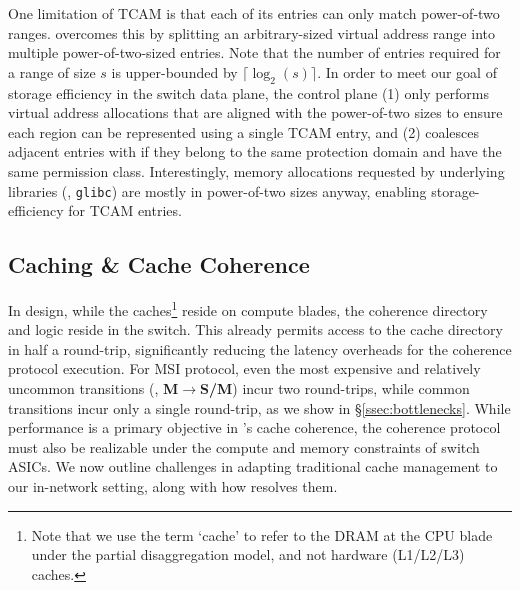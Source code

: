 One limitation of TCAM is that each of its entries can only match power-of-two ranges. \mind overcomes this by splitting an arbitrary-sized virtual address range into multiple power-of-two-sized entries. Note that the number of entries required for a range of size $s$ is upper-bounded by $\lceil\log_2(s)\rceil$. In order to meet our goal of storage efficiency in the switch data plane, the control plane (1) only performs virtual address allocations that are aligned with the power-of-two sizes to ensure each region can be represented using a single TCAM entry, and (2) coalesces adjacent entries with if they belong to the same protection domain and have the same permission class. Interestingly, memory allocations requested by underlying libraries (\eg, \texttt{glibc}) are mostly in power-of-two sizes anyway, enabling storage-efficiency for TCAM entries.

\subsection{Caching \& Cache Coherence}
\label{ssec:caching}

In \mind design, while the caches\footnote{Note that we use the term `cache' to refer to the DRAM at the CPU blade under the partial disaggregation model, and not hardware (L1/L2/L3) caches.} reside on compute blades, the coherence directory and logic reside in the switch. This already permits access to the cache directory in half a round-trip, significantly reducing the latency overheads for the coherence protocol execution. For MSI protocol, even the most expensive and relatively uncommon transitions (\ie, \textbf{M}$\rightarrow$\textbf{S/M}) incur two round-trips, while common transitions incur only a single round-trip, as we show in \S\ref{ssec:bottlenecks}. While performance is a primary objective in \mind's cache coherence, the coherence protocol must also be realizable under the compute and memory constraints of switch ASICs. We now outline challenges in adapting traditional cache management to our in-network setting, along with how \mind resolves them.

